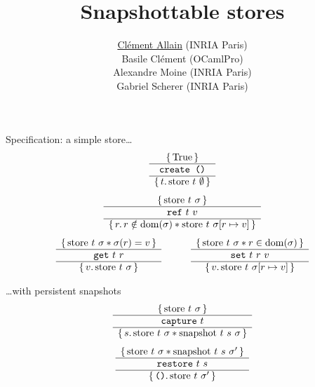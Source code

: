 \documentclass[usenames,dvipsnames]{beamer}
\title{
  Snapshottable stores
}
\author{
  \underline{Clément Allain} (INRIA Paris)\\
  Basile Clément (OCamlPro) \\
  Alexandre Moine (INRIA Paris) \\
  Gabriel Scherer (INRIA Paris)
}
\begin{document}

\begin{frame}
\titlepage
\end{frame}




\begin{frame}{Specification: a simple store\dots}
\large
\[
  \begin{array}{c} \left\lbrace\, 
    \mathrm{True}
   \,\right\rbrace \\ \hline 
    \texttt{create ()}
   \\ \hline \left\lbrace\, 
    t
   \ldotp 
    \mathrm{store}\ t\ \emptyset
   \,\right\rbrace \end{array}
\]
\vfill
\[
  \begin{array}{c} \left\lbrace\, 
    \mathrm{store}\ t\ \sigma
   \,\right\rbrace \\ \hline 
    \texttt{ref}\ t\ v
   \\ \hline \left\lbrace\, 
    r
   \ldotp 
    r \notin \mathrm{dom} (\sigma) \ast
    \mathrm{store}\ t\ \sigma[r \mapsto v]
   \,\right\rbrace \end{array}
\]
\vfill
\[
  \begin{array}{cccc}
      \begin{array}{c} \left\lbrace\, 
        \mathrm{store}\ t\ \sigma \ast
        \sigma (r) = v
       \,\right\rbrace \\ \hline 
        \texttt{get}\ t\ r
       \\ \hline \left\lbrace\, 
        v
       \ldotp 
        \mathrm{store}\ t\ \sigma
       \,\right\rbrace \end{array}
    &&&
      \begin{array}{c} \left\lbrace\, 
        \mathrm{store}\ t\ \sigma \ast
        r \in \mathrm{dom} (\sigma)
       \,\right\rbrace \\ \hline 
        \texttt{set}\ t\ r\ v
       \\ \hline \left\lbrace\, 
        v
       \ldotp 
        \mathrm{store}\ t\ \sigma[r \mapsto v]
       \,\right\rbrace \end{array}
  \end{array}
\]
\end{frame}

\begin{frame}{\dots with persistent snapshots}
\Large
\[
  \begin{array}{c} \left\lbrace\, 
    \mathrm{store}\ t\ \sigma
   \,\right\rbrace \\ \hline 
    \texttt{capture}\ t
   \\ \hline \left\lbrace\, 
    s
   \ldotp 
    \mathrm{store}\ t\ \sigma \ast
    \mathrm{snapshot}\ t\ s\ \sigma
   \,\right\rbrace \end{array}
\]
\vfill
\[
  \begin{array}{c} \left\lbrace\, 
    \mathrm{store}\ t\ \sigma \ast
    \mathrm{snapshot}\ t\ s\ \sigma'
   \,\right\rbrace \\ \hline 
    \texttt{restore}\ t\ s
   \\ \hline \left\lbrace\, 
    \texttt{()}
   \ldotp 
    \mathrm{store}\ t\ \sigma'
   \,\right\rbrace \end{array}
\]
\end{frame}
\end{document}
